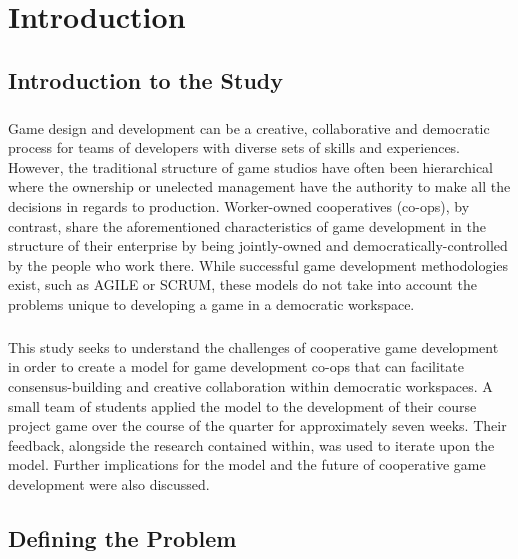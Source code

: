 \chapter{Introduction}


\section{Introduction to the Study}


\paragraph{} Game design and development can be a creative, collaborative and democratic process for teams of developers with diverse sets of skills and experiences. However, the traditional structure of game studios have often been hierarchical where the ownership or unelected management have the authority to make all the decisions in regards to production. Worker-owned cooperatives (co-ops), by contrast, share the aforementioned characteristics of game development in the structure of their enterprise by being jointly-owned and democratically-controlled by the people who work there. While successful game development methodologies exist, such as AGILE or SCRUM, these models do not take into account the problems unique to developing a game in a democratic workspace.

\paragraph{} This study seeks to understand the challenges of cooperative game development in order to create a model for game development co-ops that can facilitate consensus-building and creative collaboration within democratic workspaces. A small team of students applied the model to the development of their course project game over the course of the quarter for approximately seven weeks. Their feedback, alongside the research contained within, was used to iterate upon the model. Further implications for the model and the future of cooperative game development were also discussed. 

\section{Defining the Problem}

